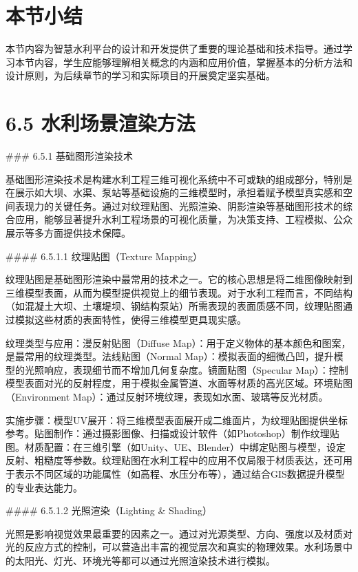 \section{本节小结}

本节内容为智慧水利平台的设计和开发提供了重要的理论基础和技术指导。通过学习本节内容，学生应能够理解相关概念的内涵和应用价值，掌握基本的分析方法和设计原则，为后续章节的学习和实际项目的开展奠定坚实基础。

\section{6.5 水利场景渲染方法}

\#\#\# 6.5.1 基础图形渲染技术

基础图形渲染技术是构建水利工程三维可视化系统中不可或缺的组成部分，特别是在展示如大坝、水渠、泵站等基础设施的三维模型时，承担着赋予模型真实感和空间表现力的关键任务。通过对纹理贴图、光照渲染、阴影渲染等基础图形技术的综合应用，能够显著提升水利工程场景的可视化质量，为决策支持、工程模拟、公众展示等多方面提供技术保障。

\#\#\#\# 6.5.1.1 纹理贴图（Texture Mapping）

纹理贴图是基础图形渲染中最常用的技术之一。它的核心思想是将二维图像映射到三维模型表面，从而为模型提供视觉上的细节表现。对于水利工程而言，不同结构（如混凝土大坝、土壤堤坝、钢结构泵站）所需表现的表面质感不同，纹理贴图通过模拟这些材质的表面特性，使得三维模型更具现实感。

纹理类型与应用：漫反射贴图（Diffuse Map）：用于定义物体的基本颜色和图案，是最常用的纹理类型。法线贴图（Normal Map）：模拟表面的细微凸凹，提升模型的光照响应，表现细节而不增加几何复杂度。镜面贴图（Specular Map）：控制模型表面对光的反射程度，用于模拟金属管道、水面等材质的高光区域。环境贴图（Environment Map）：通过反射环境纹理，表现如水面、玻璃等反光材质。

实施步骤：模型UV展开：将三维模型表面展开成二维面片，为纹理贴图提供坐标参考。贴图制作：通过摄影图像、扫描或设计软件（如Photoshop）制作纹理贴图。材质配置：在三维引擎（如Unity、UE、Blender）中绑定贴图与模型，设定反射、粗糙度等参数。纹理贴图在水利工程中的应用不仅局限于材质表达，还可用于表示不同区域的功能属性（如高程、水压分布等），通过结合GIS数据提升模型的专业表达能力。

\#\#\#\# 6.5.1.2 光照渲染（Lighting \& Shading）

光照是影响视觉效果最重要的因素之一。通过对光源类型、方向、强度以及材质对光的反应方式的控制，可以营造出丰富的视觉层次和真实的物理效果。水利场景中的太阳光、灯光、环境光等都可以通过光照渲染技术进行模拟。

